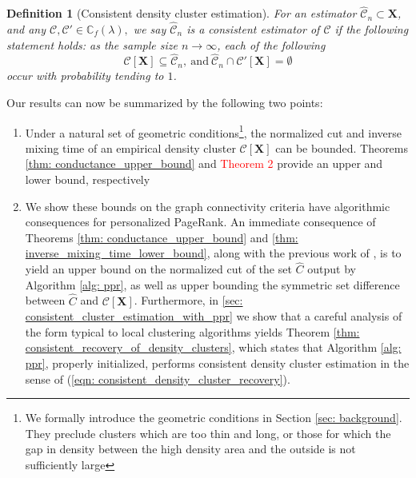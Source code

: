 \documentclass{article}
\newcommand{\1}{\mathbf{1}}
\newcommand{\Xbf}{\mathbf{X}}
\newcommand{\Cbb}{\mathbb{C}}
\newcommand{\Cset}{\mathcal{C}}
\theoremstyle{aldenthm}
\newtheorem{definition}{Definition}
\theoremstyle{remark}
\begin{document}
\begin{definition}[Consistent density cluster estimation]
	\label{def: consistent_density_cluster_estimation}
	For an estimator $\widehat{\Cset}_n \subset \Xbf$, and any $\Cset, \Cset' \in \Cbb_f(\lambda),$ we say $\widehat{\Cset}_n$ is a consistent estimator of $\Cset$ if the following statement holds: as the sample size $n \to \infty$, each of the following
	\begin{equation}
	\label{eqn: consistent_density_cluster_recovery}
	\Cset[\Xbf] \subseteq \widehat{\Cset}_n, ~\mathrm{ and }~ \widehat{\Cset}_n \cap \Cset'[\Xbf] = \emptyset
	\end{equation}
	occur with probability tending to $1$.
	
\end{definition}


Our results can now be summarized by the following two points:

\begin{enumerate}
	\item 
	Under a natural set of geometric conditions\footnote{We formally introduce the geometric conditions in Section \ref{sec: background}. They preclude clusters which are too thin and long, or those for which the gap in density between the high density area and the outside is not sufficiently large}, the normalized cut and inverse mixing time of an empirical density cluster $\Cset[\Xbf]$ can be bounded. Theorems \ref{thm: conductance_upper_bound} and \textcolor{red}{Theorem 2} provide an upper and lower bound, respectively
	
	\item 
	We show these bounds on the graph connectivity criteria have algorithmic consequences for personalized PageRank. An immediate consequence of Theorems \ref{thm: conductance_upper_bound} and \ref{thm: inverse_mixing_time_lower_bound}, along with the previous work of \cite{zhu2013}, is to yield an upper bound on the normalized cut of the set $\widehat{C}$ output by Algorithm \ref{alg: ppr}, as well as upper bounding the symmetric set difference between $\widehat{C}$ and $\Cset[\Xbf]$. Furthermore, in \ref{sec: consistent_cluster_estimation_with_ppr} we show that a careful analysis of the form typical to local clustering algorithms yields Theorem \ref{thm: consistent_recovery_of_density_clusters}, which states that Algorithm \ref{alg: ppr}, properly initialized, performs consistent density cluster estimation in the sense of (\ref{eqn: consistent_density_cluster_recovery}).
\end{enumerate}
\end{document}
